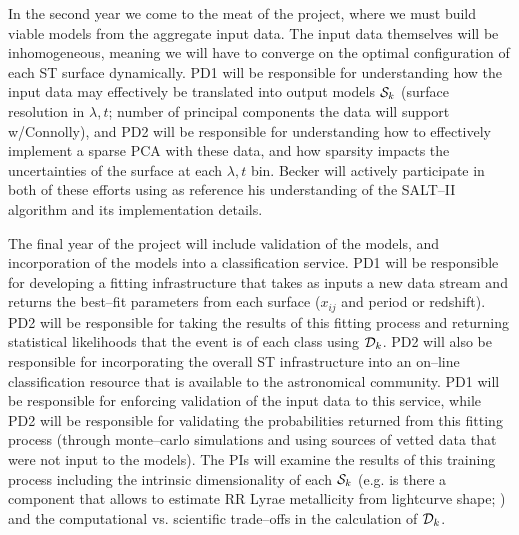 In the second year we come to the meat of the project, where we must build
viable models from the aggregate input data.  The input data themselves will be
inhomogeneous, meaning we will have to converge on the optimal configuration of
each ST surface dynamically. PD1 will be responsible for understanding how the
input data may effectively be translated into output models ${\cal S}_k$
(surface resolution in $\lambda, t$; number of principal components the data
will support w/Connolly), and PD2 will be responsible for understanding how to
effectively implement a sparse PCA with these data, and how sparsity impacts the
uncertainties of the surface at each $\lambda, t$ bin. Becker will actively
participate in both of these efforts using as reference his understanding of the
SALT--II algorithm and its implementation details.


 \smallskip

The final year of the project will include validation of the models, and
incorporation of the models into a classification service.  PD1 will be
responsible for developing a fitting infrastructure that takes as inputs a new
data stream and returns the best--fit parameters from each surface ($x_{ij}$ and
period or redshift).  PD2 will be responsible for taking the results of this
fitting process and returning statistical likelihoods that the event is of each
class using ${\cal D}_k$.  PD2 will also be responsible for incorporating the
overall ST infrastructure into an on--line classification resource that is
available to the astronomical community. PD1 will be responsible for enforcing
validation of the input data to this service, while PD2 will be responsible for
validating the probabilities returned from this fitting process (through
monte--carlo simulations and using sources of vetted data that were not input to
the models). The PIs will examine the results of this training process including
the intrinsic dimensionality of each ${\cal S}_k$ (e.g. is there a component
that allows to estimate RR Lyrae metallicity from lightcurve shape;
\citealt{1996A&A...312..111J}) and the computational vs. scientific trade--offs
in the calculation of ${\cal D}_k$.

